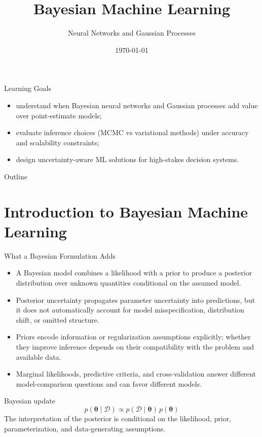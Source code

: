 \documentclass[aspectratio=169,11pt]{beamer}
\title[Bayesian ML]{Bayesian Machine Learning}
\subtitle{Neural Networks and Gaussian Processes}
\date{\today}
\newcommand{\btheta}{\boldsymbol{\theta}}
\begin{document}
\begin{frame}
\titlepage
\end{frame}

\begin{frame}{Learning Goals}
\begin{itemize}
\item understand when Bayesian neural networks and Gaussian processes add value over point-estimate models;
\item evaluate inference choices (MCMC vs variational methods) under accuracy and scalability constraints;
\item design uncertainty-aware ML solutions for high-stakes decision systems.
\end{itemize}
\end{frame}

\begin{frame}{Outline}
\tableofcontents
\end{frame}

\section{Introduction to Bayesian Machine Learning}

\begin{frame}{What a Bayesian Formulation Adds}
  \begin{itemize}
    \item A Bayesian model combines a likelihood with a prior to produce a posterior distribution over unknown quantities conditional on the assumed model.
    \item Posterior uncertainty propagates parameter uncertainty into predictions, but it does not automatically account for model misspecification, distribution shift, or omitted structure.
    \item Priors encode information or regularization assumptions explicitly; whether they improve inference depends on their compatibility with the problem and available data.
    \item Marginal likelihoods, predictive criteria, and cross-validation answer different model-comparison questions and can favor different models.
  \end{itemize}

  \begin{block}{Bayesian update}
    \[p(\btheta\mid\mathcal{D}) \propto p(\mathcal{D}\mid\btheta)\,p(\btheta)\]
    The interpretation of the posterior is conditional on the likelihood, prior, parameterization, and data-generating assumptions.
  \end{block}
\end{frame}
\end{document}
